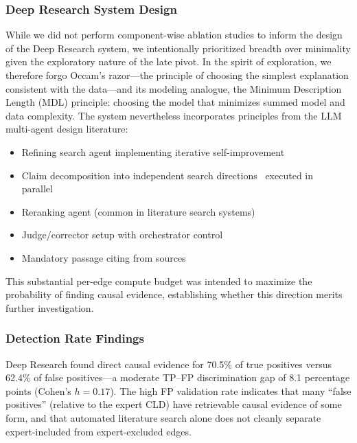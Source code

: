 \subsubsection{Deep Research System Design}

While we did not perform component-wise ablation studies to inform the design of the Deep Research system, we intentionally prioritized breadth over minimality given the exploratory nature of the late pivot. In the spirit of exploration, we therefore forgo Occam's razor---the principle of choosing the simplest explanation consistent with the data---and its modeling analogue, the Minimum Description Length (MDL) principle: choosing the model that minimizes summed model and data complexity. The system nevertheless incorporates principles from the LLM multi-agent design literature:
\begin{itemize}[noitemsep]
    \item Refining search agent implementing iterative self-improvement~\citep{madaan2023selfrefineiterativerefinementselffeedback}
    \item Claim decomposition into independent search directions~\citep{dhuliawala2024chain} executed in parallel~\citep{snell2024scalingllmtesttimecompute}
    \item Reranking agent (common in literature search systems)~\citep{muennighoff2023mteb, qwen3embedding2025}
    \item Judge/corrector setup with orchestrator control~\citep{pydanticai2024, snell2024scalingllmtesttimecompute}
    \item Mandatory passage citing from sources~\citep{batista2025safeimprovingllmsystems}
\end{itemize}

This substantial per-edge compute budget was intended to maximize the probability of finding causal evidence, establishing whether this direction merits further investigation.

\subsubsection{Detection Rate Findings}

Deep Research found direct causal evidence for 70.5\% of true positives versus 62.4\% of false positives---a moderate TP--FP discrimination gap of 8.1 percentage points (Cohen's $h=0.17$). The high FP validation rate indicates that many ``false positives'' (relative to the expert CLD) have retrievable causal evidence of some form, and that automated literature search alone does not cleanly separate expert-included from expert-excluded edges.

